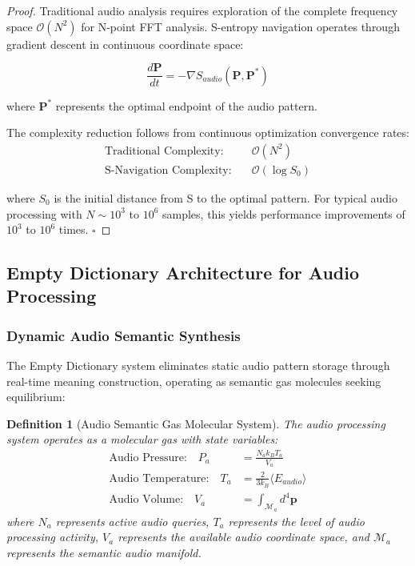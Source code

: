 \documentclass[12pt,a4paper]{article}
\newtheorem{definition}{Definition}
\begin{document}
\begin{proof}
Traditional audio analysis requires exploration of the complete frequency space $\mathcal{O}(N^2)$ for N-point FFT analysis. S-entropy navigation operates through gradient descent in continuous coordinate space:

\begin{equation}
\frac{d\mathbf{P}}{dt} = -\nabla S_{audio}(\mathbf{P}, \mathbf{P}^*)
\end{equation}

where $\mathbf{P}^*$ represents the optimal endpoint of the audio pattern.

The complexity reduction follows from continuous optimization convergence rates:
\begin{align}
\text{Traditional Complexity:} \quad &\mathcal{O}(N^2) \\
\text{S-Navigation Complexity:} \quad &\mathcal{O}(\log S_0)
\end{align}

where $S_0$ is the initial distance from S to the optimal pattern. For typical audio processing with $N \sim 10^3$ to $10^6$ samples, this yields performance improvements of $10^3$ to $10^6$ times. $\square$
\end{proof}

\subsection{Empty Dictionary Architecture for Audio Processing}

\subsubsection{Dynamic Audio Semantic Synthesis}

The Empty Dictionary system eliminates static audio pattern storage through real-time meaning construction, operating as semantic gas molecules seeking equilibrium:

\begin{definition}[Audio Semantic Gas Molecular System]
The audio processing system operates as a molecular gas with state variables:
\begin{align}
\text{Audio Pressure:} \quad P_a &= \frac{N_a k_B T_a}{V_a} \\
\text{Audio Temperature:} \quad T_a &= \frac{2}{3k_B}\langle E_{audio} \rangle \\
\text{Audio Volume:} \quad V_a &= \int_{\mathcal{M}_a} d^4\mathbf{p}
\end{align}
where $N_a$ represents active audio queries, $T_a$ represents the level of audio processing activity, $V_a$ represents the available audio coordinate space, and $\mathcal{M}_a$ represents the semantic audio manifold.
\end{definition}
\end{document}
